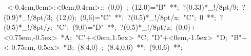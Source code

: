\hbox{
\xy    <-0.4cm,0cm>:<0cm,0.4cm>::
       (0,0) ; (12,0)="B" **\dir{-}; ?(0.33)*_!/8pt/{9};
       ?(0.9)*_!/8pt/{3}; (12,0); (9,6)="C" **\dir{-};
       ?(0.5)*_!/8pt/{x};
       "C"; 0 **\dir{-}; ?(0.5)*_!/8pt/{y}; 
       "C"; (9,0)="D" **\dir{-}; ?(0.5)*_!/8pt/{z}; 
       (0,0)+<0.75em,-0.5ex> *{A};
       "C"+<0em,1.5ex> *{C};
       "D"+<0em,-1.5ex> *{D};
       "B"+<-0.75em,-0.5ex> *{B};
	(8.4,0) ; (8.4,0.6) **\dir{-}; (9,0.6) **\dir{-};
       \endxy}
	   
